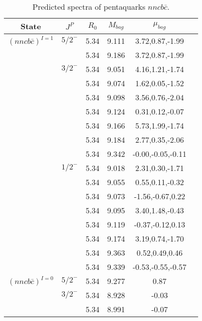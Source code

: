 \documentclass[prd,twocolumn,floatfix,nofootinbib]{revtex4}
\begin{document}
\begin{table*}[!htbp]
    \caption{Predicted spectra of pentaquarks $nncb\bar{c }$.}
    \begin{tabular}{cccccc}
        \hline\hline
        {\rm State} &$J^{P}$ &$R_{0}$ &$M_{bag}$ &$\mu_{bag}$  \\ \hline
        ${(nncb\bar{c})}^{I=1}$
            &${5/2}^{-}$     &5.34   &9.111 &3.72,0.87,-1.99 \\ 
                         &$ $     &5.34   &9.186 &3.72,0.87,-1.99 \\                         
            &${3/2}^{-}$     &5.34   &9.051 &4.16,1.21,-1.74 \\
                         &$ $     &5.34   &9.074 &1.62,0.05,-1.52  \\
                         &$ $     &5.34   &9.098 &3.56,0.76,-2.04  \\
                         &$ $     &5.34   &9.124 &0.31,0.12,-0.07 \\
                         &$ $     &5.34   &9.166 &5.73,1.99,-1.74  \\
                         &$ $     &5.34   &9.184 &2.77,0.35,-2.06  \\
                         &$ $     &5.34   &9.342 &-0.00,-0.05,-0.11 \\                        
            &${1/2}^{-}$     &5.34   &9.018 &2.31,0.30,-1.71  \\
                         &$ $     &5.34   &9.055 &0.55,0.11,-0.32  \\
                         &$ $     &5.34   &9.073 &-1.56,-0.67,0.22  \\
                         &$ $     &5.34   &9.095 &3.40,1.48,-0.43 \\
                         &$ $     &5.34   &9.119 &-0.37,-0.12,0.13  \\
                         &$ $     &5.34   &9.174 &3.19,0.74,-1.70  \\
                         &$ $     &5.34   &9.363 &0.52,0.49,0.46 \\                         
                         &$ $     &5.34   &9.339 &-0.53,-0.55,-0.57 \\                          
            ${(nncb\bar{c})}^{I=0}$
            &${5/2}^{-}$     &5.34   &9.277 &0.87 \\                
            &${3/2}^{-}$     &5.34   &8.928 &-0.03 \\
                         &$ $     &5.34   &8.991 &-0.07  \\

\end{tabular}
\end{table*}
\end{document}

